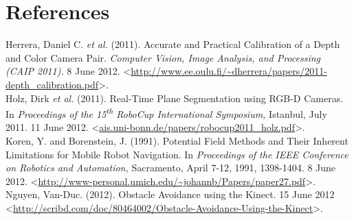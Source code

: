 \documentclass{article}
\begin{document}
\section{References}
Herrera, Daniel C. \textit{et al.} (2011). Accurate and Practical Calibration of a Depth and Color Camera Pair. \textit{Computer Vision, Image Analysis, and Processing (CAIP 2011).} 8 June 2012. <\url{http://www.ee.oulu.fi/~dherrera/papers/2011-depth_calibration.pdf}>.\\
Holz, Dirk \textit{et al.} (2011). Real-Time Plane Segmentation using RGB-D Cameras. In \textit{Proceedings of the 15\textsuperscript{th} RoboCup International Symposium,} Istanbul, July 2011. 11 June 2012. <\url{ais.uni-bonn.de/papers/robocup2011_holz.pdf}>.\\
Koren, Y. and Borenstein, J. (1991). Potential Field Methods and Their Inherent Limitations for Mobile Robot Navigation. In \textit{Proceedings of the IEEE Conference on Robotics and Automation,} Sacramento, April 7-12, 1991, 1398-1404. 8 June 2012. <\url{http://www-personal.umich.edu/~johannb/Papers/paper27.pdf}>.\\
Nguyen, Van-Duc. (2012). Obstacle Avoidance using the Kinect. 15 June 2012 <\url{http://scribd.com/doc/80464002/Obstacle-Avoidance-Using-the-Kinect}>.
\end{document}
